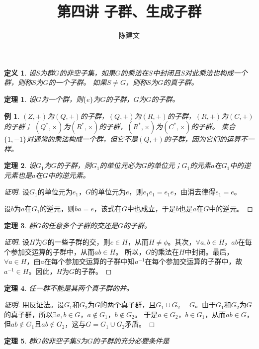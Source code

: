 \documentclass{article}
\newtheorem{Def}{定义}
\newtheorem{Thm}{定理}
\newtheorem*{Example}{例}
\begin{document}
\begin{CJK*}{UTF8}{gbsn}
  \title{第四讲 子群、生成子群}
  \author{陈建文}
  \maketitle
 \begin{Def}
  设$S$为群$G$的非空子集，如果$G$的乘法在$S$中封闭且$S$对此乘法也构成一个群，则称$S$为$G$的一个子群。
  如果$S\neq G$，则称$S$为$G$的真子群。
 \end{Def} 
\begin{Thm}
设$G$为一个群，则$\{e\}$为$G$的子群，$G$为$G$的子群。
\end{Thm}
\begin{Example}
  $(Z,+)$为$(Q,+)$的子群，$(Q,+)$为$(R,+)$的子群，$(R,+)$为$(C,+)$的子群；
  $(Q^*,\times)$为$(R^*,\times)$的子群，$(R^*,\times)$为$(C^*,\times)$的子群。
  集合$\{1,-1\}$对通常的乘法构成一个群，但它不是$(Q,+)$的子群，因为它们的运算不一样。
\end{Example}

 \begin{Thm}
  设$G_1$为$G$的子群，则$G_1$的单位元必为$G$的单位元；$G_1$的元素$a$在$G_1$中的逆元素也是$a$在$G$中的逆元素。
 \end{Thm}
\begin{proof}[证明]
  设$G_1$的单位元为$e_1$，$G$的单位元为$e$，则$e_1e_1=e_1e$，由消去律得$e_1=e$。

  设$b$为$a$在$G_1$的逆元，则$ba=e$，该式在$G$中也成立，于是$b$也是$a$在$G$中的逆元。
\end{proof}
 \begin{Thm}
  群$G$的任意多个子群的交还是$G$的子群。
 \end{Thm}
\begin{proof}[证明]
  设$H$为$G$的一些子群的交，则$e\in H$，从而$H\neq \phi$。其次，$\forall a,b\in H$，$ab$在每个参加交运算的子群中，从而$ab\in H$。
  所以，$G$的乘法在$H$中封闭。最后，$\forall a\in H$，由$a$在每个参加交运算的子群中知$a^{-1}$在每个参加交运算的子群中，故$a^{-1}\in H$。因此，$H$为$G$的子群。
\end{proof}
 \begin{Thm}
  任一群不能是其两个真子群的并。
 \end{Thm}
\begin{proof}[证明]
  用反证法。设$G_1$和$G_2$为$G$的两个真子群，且$G_1\cup G_2=G$。由于$G_1$和$G_2$为$G$的真子群，所以$\exists a,b\in G$，$a\notin G_1$，$b\notin G_2$。
  于是$a\in G_2$，$b\in G_1$，从而$ab\in G$，但$ab\notin G_1$且$ab\notin G_2$，这与$G=G_1\cup G_2$矛盾。
\end{proof}
 \begin{Thm}
  群$G$的非空子集$S$为$G$的子群的充分必要条件是


\end{Thm}
\end{CJK*}
\end{document}
